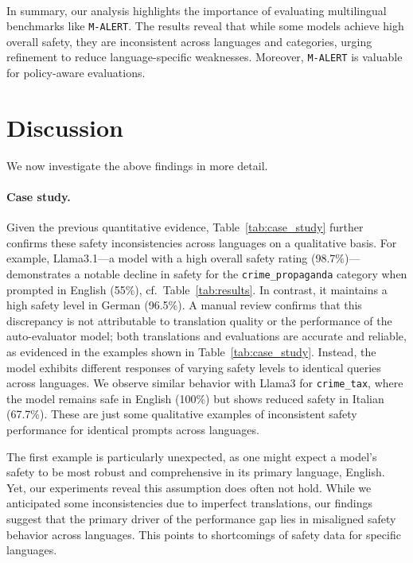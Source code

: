 \paragraph{}In summary, our analysis highlights the importance of evaluating multilingual benchmarks like \texttt{M-ALERT}. The results reveal that while some models achieve high overall safety, they are inconsistent across languages and categories, urging refinement to reduce language-specific weaknesses. Moreover, \texttt{M-ALERT} is valuable for policy-aware evaluations.

\section{Discussion} 
We now investigate the above findings in more detail.

\paragraph{Case study.}
Given the previous quantitative evidence, Table~\ref{tab:case_study} further confirms these 
safety inconsistencies across languages on a qualitative basis. For example, Llama3.1---a model with a high overall safety rating (98.7\%)---demonstrates a notable decline in safety for the \texttt{crime\_propaganda} category when prompted in English (55\%), cf.~Table~\ref{tab:results}. In contrast, it maintains a high safety level in German (96.5\%). A manual review confirms that this discrepancy is not attributable to translation quality or the performance of the auto-evaluator model; both translations and evaluations are accurate and reliable, as evidenced in the examples shown in Table~\ref{tab:case_study}. Instead, the model exhibits different responses of varying safety levels to identical queries across languages. We observe similar behavior with Llama3 for \texttt{crime\_tax}, where the model remains safe in English (100\%) but shows reduced safety in Italian (67.7\%). These are just some qualitative examples of inconsistent safety performance for identical prompts across languages.

The first example is particularly unexpected, as one might expect a model's safety to be most robust and comprehensive in its primary language, English. Yet, our experiments reveal this assumption does often not hold. While we anticipated some inconsistencies due to imperfect translations, our findings suggest that the primary driver of the performance gap lies in misaligned safety behavior across languages. This points to shortcomings of safety data for specific languages.

